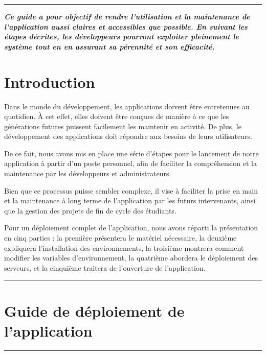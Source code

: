 \documentclass[12pt]{article}
\begin{document}
\vfill
\rule{\linewidth}{0.2pt}
\textbf{\textit{Ce guide a pour objectif de rendre l’utilisation et la maintenance de l’application aussi claires et accessibles
que possible. En suivant les étapes décrites, les développeurs pourront exploiter pleinement le système tout en en assurant sa 
pérennité et son efficacité.}}

\newpage

{\fontsize{14}{16}\section*{Introduction}}
Dans le monde du développement, les applications doivent être entretenues au quotidien.
À cet effet, elles doivent être conçues de manière à ce que les générations futures puissent
facilement les maintenir en activité. De plus, le développement des applications doit répondre
aux besoins de leurs utilisateurs.

De ce fait, nous avons mis en place une série d'étapes pour le lancement de notre application
à partir d’un poste personnel, afin de faciliter la compréhension et la maintenance par les
développeurs et administrateurs.

Bien que ce processus puisse sembler complexe, il vise à faciliter la prise en main et la
maintenance à long terme de l’application par les futurs intervenants, ainsi que la gestion
des projets de fin de cycle des étudiants.

Pour un déploiement complet de l'application, nous avons réparti la présentation en cinq
parties : la première présentera le matériel nécessaire, la deuxième expliquera l'installation
des environnements, la troisième montrera comment modifier les variables d'environnement, la
quatrième abordera le déploiement des serveurs, et la cinquième traitera de l'ouverture de l'application.

\vspace{0.5cm}
\rule{\linewidth}{0.2pt}

\newpage
{\fontsize{14}{16}\section*{Guide de déploiement de l’application}}
\setcounter{subsection}{0} %
\renewcommand\thesubsection{\arabic{subsection}}
\rule{\linewidth}{0.2pt}
\end{document}
